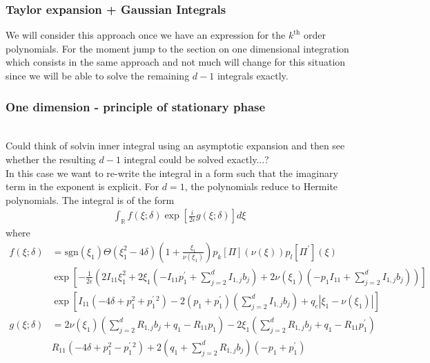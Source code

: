 \subsubsection{Taylor expansion + Gaussian Integrals}
We will consider this approach once we have an expression for the $k^\text{th}$ 
order polynomials. For the moment jump to the section on one dimensional 
integration which consists in the same approach and not much will change 
for this situation since we will be able to solve the remaining $d-1$ 
integrals exactly.
%
%
%
%
\subsubsection{One dimension - principle of stationary phase}
\\
Could think of solvin inner integral using an asymptotic expansion 
and then see whether the resulting $d-1$ integral could be solved exactly...?
\\
In this case we want to re-write the integral in a form such that the imaginary term in 
the exponent is explicit. For $d=1$, the polynomials reduce to Hermite polynomials.
The integral is of the form  
\begin{equation}
  \begin{split}
    \int_{\mathbb{R}} f(\xi; \delta) \exp{\left[ \frac{i}{2\epsilon} g(\xi; \delta)  \right]} d \xi
  \end{split}
\end{equation}
where 
\begin{equation}
  \begin{split}
      f(\xi; \delta) &= \text{sgn}(\xi_1) \Theta(\xi_1^2 - 4\delta)\left( 1 + \frac{\xi_1}{\nu(\xi_1)} \right)
      p_k[\Pi](\nu(\xi)) p_l[\Pi^\prime](\xi)
      \\
      &
      \exp{\left[ - \frac{1}{2\epsilon} (2 I_{11} \xi_1^2 
          + 2\xi_1(-I_{11}p_1^\prime + \sum_{j=2}^d I_{1,j}b_j) 
          + 2\nu(\xi_1)(-p_1I_{11} + \sum_{j=2}^dI_{1,j}b_j)
      )  \right]}
          \\
      &
         \exp{\left[
             I_{11}(-4\delta + p_1^2 + p_1^\prime^2) 
             - 2 (p_1 + p_1^\prime)(\sum_{j=2}^dI_{1,j}b_j)
             + q_c|\xi_1 - \nu(\xi_1)|
      \right]}
      \\
      g(\xi; \delta) &= 2\nu(\xi_1)( \sum_{j=2}^dR_{1,j}b_j + q_1 - R_{11}p_1  ) 
      - 2\xi_1(\sum_{j=2}^d R_{1,j}b_j + q_1  - R_{11}p_1^\prime )
       \\
      & R_{11}(- 4\delta + p_1^2 - p_1^\prime^2)
      + 2\left( q_1 + \sum_{j = 2}^d R_{1,j}b_j \right) (- p_1 + p_1^\prime ) 
  \end{split}
\end{equation}
